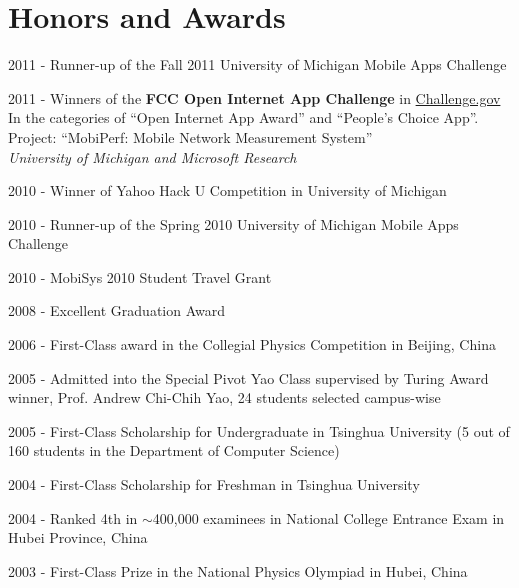\documentclass[letterpaper]{article}
\renewenvironment{itemize}{
  \begin{list}{}{
    \setlength{\leftmargin}{1em}
  }
}{
  \end{list}
}
\begin{document}
\section*{Honors and Awards}
\begin{itemize}

\item{2011 - Runner-up of the Fall 2011 University of Michigan Mobile Apps Challenge}

\item{2011 - Winners of the \textbf{FCC Open Internet App Challenge} in \url{Challenge.gov}\\
In the categories of  ``Open Internet App Award'' and ``People's Choice App''.\\
Project: ``MobiPerf: Mobile Network Measurement System''\\
{\em University of Michigan and Microsoft Research}}

\item{2010 - Winner of Yahoo Hack U Competition in University of Michigan}

\item{2010 - Runner-up of the Spring 2010 University of Michigan Mobile Apps Challenge}

\item{2010 - MobiSys 2010 Student Travel Grant}

\item{2008 - Excellent Graduation Award}

\item{2006 - First-Class award in the Collegial Physics Competition in Beijing, China }

\item {2005 - Admitted into the Special Pivot Yao Class supervised by Turing Award winner, Prof. Andrew Chi-Chih Yao, 24 students selected campus-wise}

\item {2005 - First-Class Scholarship for Undergraduate in Tsinghua University (5 out of 160 students in the Department of Computer Science)}

\item {2004 - First-Class Scholarship for Freshman in Tsinghua University}

\item {2004 - Ranked 4th in $\sim$400,000 examinees in National College Entrance Exam in Hubei Province, China}

\item {2003 - First-Class Prize in the National Physics Olympiad in Hubei, China}

\end{itemize}
\end{document}
